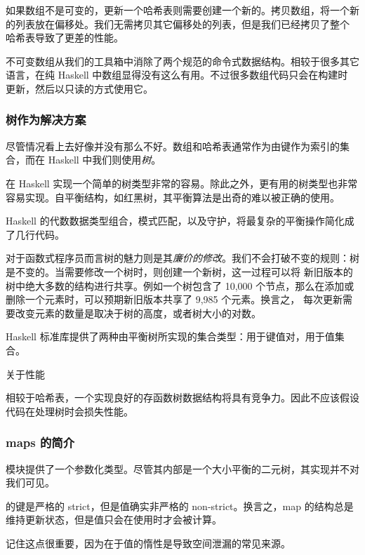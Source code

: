 \documentclass[./main.tex]{subfiles}
\begin{document}
如果数组不是可变的，更新一个哈希表则需要创建一个新的。拷贝数组，将一个新的列表放在偏移处。我们无需拷贝其它偏移处的列表，但是我们已经拷贝了整个
哈希表导致了更差的性能。

不可变数组从我们的工具箱中消除了两个规范的命令式数据结构。相较于很多其它语言，在纯 Haskell 中数组显得没有这么有用。不过很多数组代码只会在构建时
更新，然后以只读的方式使用它。

\subsubsection*{树作为解决方案}

尽管情况看上去好像并没有那么不好。数组和哈希表通常作为由键作为索引的集合，而在 Haskell 中我们则使用\textit{树}。

在 Haskell 实现一个简单的树类型非常的容易。除此之外，更有用的树类型也非常容易实现。自平衡结构，如红黑树，其平衡算法是出奇的难以被正确的使用。

Haskell 的代数数据类型组合，模式匹配，以及守护，将最复杂的平衡操作简化成了几行代码。

对于函数式程序员而言树的魅力则是其\textit{廉价的修改}。我们不会打破不变的规则：树是不变的。当需要修改一个树时，则创建一个新树，这一过程可以将
新旧版本的树中绝大多数的结构进行共享。例如一个树包含了 10,000 个节点，那么在添加或删除一个元素时，可以预期新旧版本共享了 9,985 个元素。换言之，
每次更新需要改变元素的数量是取决于树的高度，或者树大小的对数。

Haskell 标准库提供了两种由平衡树所实现的集合类型：用于键值对，用于值集合。

\begin{anote}
  关于性能

  相较于哈希表，一个实现良好的存函数树数据结构将具有竞争力。因此不应该假设代码在处理树时会损失性能。
\end{anote}

\subsubsection*{maps 的简介}

模块提供了一个参数化类型。尽管其内部是一个大小平衡的二元树，其实现并不对我们可见。

的键是严格的 strict，但是值确实非严格的 non-strict。换言之，map 的结构总是维持更新状态，但是值只会在使用时才会被计算。

记住这点很重要，因为在于值的惰性是导致空间泄漏的常见来源。
\end{document}
